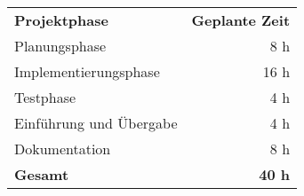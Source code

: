 \begin{tabular}{lr}
\rowcolor{heading}\textbf{Projektphase} & \textbf{Geplante Zeit} \\
Planungsphase & 8 h \\
\rowcolor{odd}Implementierungsphase & 16 h \\
Testphase & 4 h \\
\rowcolor{odd}Einführung und Übergabe & 4 h \\
Dokumentation & 8 h\\
\hline
\hline
\rowcolor{odd}\textbf{Gesamt} & \textbf{40 h} \\
\end{tabular}